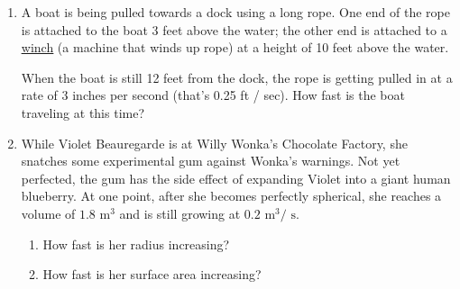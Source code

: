 \begin{enumerate}[leftmargin=0pt]
\begin{multicols}{2}
A batter standing at home plate hits a ball along the line connecting home plate and third base, and starts running toward first base, 
\underline{\href{https://www.youtube.com/watch?v=3tMKgfJBcAU}{like this}}. 
\vfill
\begin{center}
\end{center}
\end{multicols}
\begin{enumerate}
    \item Ignore the runner for now and just think about the ball: How fast is the distance between the ball and first base changing when the ball is halfway to third base, if at that instant the ball is traveling 100 ft / sec?
    
    \item How fast is the distance between the ball and the runner changing at the same instant, if at the same instant the runner is 10 feet away from home plate, running at 30 ft / sec?
\end{enumerate}

\item A boat is being pulled towards a dock using a long rope.  One end of the rope is attached to the boat 3 feet above the water; the other end is attached to a \underline{\href{https://www.dockboxes.com/site/wp-content/uploads/2022/12/8-Winch_CP.jpg}{winch}} (a machine that winds up rope) at a height of 10 feet above the water. 

When the boat is still 12 feet from the dock, the rope is getting pulled in at a rate of 3 inches per second (that's 0.25 ft / sec). How fast is the boat traveling at this time?

\item While Violet Beauregarde is at Willy Wonka's Chocolate Factory, she snatches some experimental gum against Wonka's warnings. Not yet perfected, the gum has the side effect of expanding Violet into a giant human blueberry. At one point, after she becomes perfectly spherical, she reaches a volume of $1.8\text{ m}^3$ and is still growing at $0.2 \text{ m}^3/\text{ s}$. 
\begin{enumerate}
    \item How fast is her radius increasing? 
    \item How fast is her surface area increasing?
\end{enumerate}
\end{enumerate}
